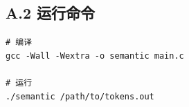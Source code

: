 \documentclass[12pt,a4paper]{ctexart}
\begin{document}
\subsection*{A.2 运行命令}
\begin{verbatim}
# 编译
gcc -Wall -Wextra -o semantic main.c

# 运行
./semantic /path/to/tokens.out
\end{verbatim}
\end{document}
